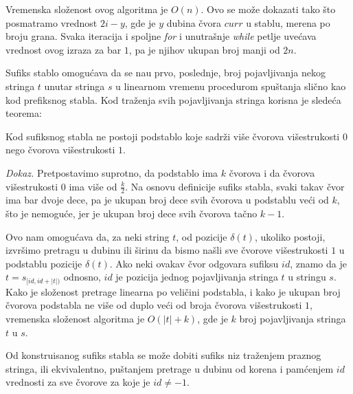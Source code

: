 \noindent
\begin{minipage}[l]{\textwidth}

\end{minipage}

Vremenska slo\v zenost ovog algoritma je $O(n)$. Ovo se mo\v ze dokazati tako \v sto posmatramo vrednost $2i-y$, gde je $y$ dubina \v cvora $curr$ u stablu, merena po broju grana. Svaka iteracija i spoljne \textit{for} i unutra\v snje \textit{while} petlje uve\' cava vrednost ovog izraza za bar $1$, pa je njihov ukupan broj manji od $2n$.

Sufiks stablo omogu\' cava da se na\dj u prvo, poslednje, broj pojavljivanja nekog stringa $t$ unutar stringa $s$ u linearnom vremenu procedurom spu\v stanja sli\v cno kao kod prefiksnog stabla. Kod tra\v zenja svih pojavljivanja stringa korisna je slede\' ca teorema:

\begin{thm}
Kod sufiksnog stabla ne postoji podstablo koje sadr\v zi vi\v se \v cvorova vi\v sestrukosti $0$ nego \v cvorova vi\v sestrukosti $1$.
\end{thm}

\textit{Dokaz.} Pretpostavimo suprotno, da podstablo ima $k$ \v cvorova i da \v cvorova vi\v sestrukosti $0$ ima vi\v se od $\frac{k}{2}$. Na osnovu definicije sufiks stabla, svaki takav \v cvor ima bar dvoje dece, pa je ukupan broj dece svih \v cvorova u podstablu ve\' ci od $k$, \v sto je nemogu\' ce, jer je ukupan broj dece svih \v cvorova ta\v cno $k-1$.

Ovo nam omogu\' cava da, za neki string $t$, od pozicije $\delta(t)$, ukoliko postoji, izvr\v simo pretragu u dubinu ili \v sirinu da bismo na\v sli sve \v cvorove vi\v sestrukosti $1$ u podstablu pozicije $\delta(t)$. Ako neki ovakav \v cvor odgovara sufiksu $id$, znamo da je $t = s_{[id, id+|t|)}$ odnosno, $id$ je pozicija jednog pojavljivanja stringa $t$ u stringu $s$. Kako je slo\v zenost pretrage linearna po veli\v cini podstabla, i kako je ukupan broj \v cvorova podstabla ne vi\v se od duplo ve\' ci od broja \v cvorova vi\v sestrukosti $1$, vremenska slo\v zenost algoritma je $O(|t|+k)$, gde je $k$ broj pojavljivanja stringa $t$ u $s$.

Od konstruisanog sufiks stabla se mo\v ze dobiti sufiks niz tra\v zenjem praznog stringa, ili ekvivalentno, pu\v stanjem pretrage u dubinu od korena i pam\' cenjem $id$ vrednosti za sve \v cvorove za koje je $id \not = -1$.

